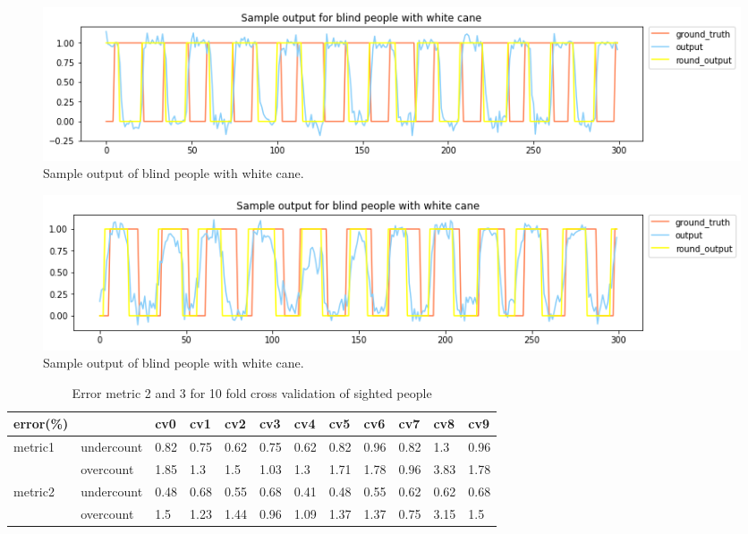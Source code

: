 \documentclass[11pt]{article}
\begin{document}
{\begin{figure}[ht]
\centering
\includegraphics[scale=0.5]{output_wc_1}
\caption{Sample output of blind people with white cane.}
\label{fig:output_wc_1}
\end{figure}

\begin{figure}[ht]
\centering
\includegraphics[scale=0.5]{output_wc_2}
\caption{Sample output of blind people with white cane.}
\label{fig:output_wc_2}
\end{figure}




\begin{table}[]
\centering
\caption{Error metric 2 and 3 for 10 fold cross validation of sighted people}
\label{label_metric23_sighted}
\begin{tabular}{llllllllllll}
\hline
error(\%)                &            & cv0   & cv1   & cv2   & cv3   & cv4   & cv5   & cv6   & cv7   & cv8   & cv9  \\ \hline
metric1                  & undercount & 0.82  & 0.75  & 0.62  & 0.75  & 0.62  & 0.82  & 0.96  & 0.82  & 1.3   & 0.96 \\
                         & overcount  & 1.85  & 1.3   & 1.5   & 1.03  & 1.3   & 1.71  & 1.78  & 0.96  & 3.83  & 1.78 \\ \hline
\multirow{2}{*}{metric2} & undercount & 0.48  & 0.68  & 0.55  & 0.68  & 0.41  & 0.48  & 0.55  & 0.62  & 0.62  & 0.68 \\
                         & overcount  & 1.5   & 1.23  & 1.44  & 0.96  & 1.09  & 1.37  & 1.37  & 0.75  & 3.15  & 1.5  \\ \hline
\end{tabular}
\end{table}


}
\end{document}

